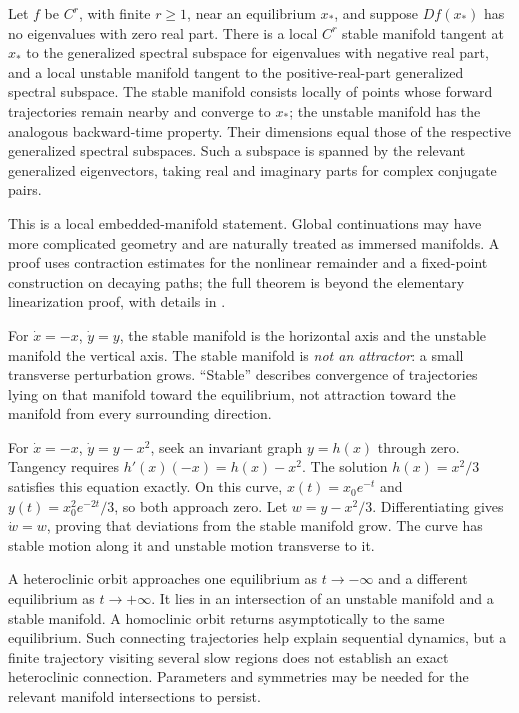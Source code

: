 \begin{theorem}\label{thm:stable-manifold}
Let $f$ be $C^r$, with finite $r\geq1$, near an equilibrium $x_*$, and suppose $Df(x_*)$ has no eigenvalues with zero real part. There is a local $C^r$ stable manifold tangent at $x_*$ to the generalized spectral subspace for eigenvalues with negative real part, and a local unstable manifold tangent to the positive-real-part generalized spectral subspace. The stable manifold consists locally of points whose forward trajectories remain nearby and converge to $x_*$; the unstable manifold has the analogous backward-time property. Their dimensions equal those of the respective generalized spectral subspaces. Such a subspace is spanned by the relevant generalized eigenvectors, taking real and imaginary parts for complex conjugate pairs.
\end{theorem}
This is a local embedded-manifold statement. Global continuations may have more complicated geometry and are naturally treated as immersed manifolds. A proof uses contraction estimates for the nonlinear remainder and a fixed-point construction on decaying paths; the full theorem is beyond the elementary linearization proof, with details in \citet{teschl2012}.

For $\dot x=-x$, $\dot y=y$, the stable manifold is the horizontal axis and the unstable manifold the vertical axis. The stable manifold is \emph{not an attractor}: a small transverse perturbation grows. ``Stable'' describes convergence of trajectories lying on that manifold toward the equilibrium, not attraction toward the manifold from every surrounding direction.

\begin{example}
For $\dot x=-x$, $\dot y=y-x^2$, seek an invariant graph $y=h(x)$ through zero. Tangency requires $h'(x)(-x)=h(x)-x^2$. The solution $h(x)=x^2/3$ satisfies this equation exactly. On this curve, $x(t)=x_0e^{-t}$ and $y(t)=x_0^2e^{-2t}/3$, so both approach zero. Let $w=y-x^2/3$. Differentiating gives $\dot w=w$, proving that deviations from the stable manifold grow. The curve has stable motion along it and unstable motion transverse to it.
\end{example}

A heteroclinic orbit approaches one equilibrium as $t\to-\infty$ and a different equilibrium as $t\to+\infty$. It lies in an intersection of an unstable manifold and a stable manifold. A homoclinic orbit returns asymptotically to the same equilibrium. Such connecting trajectories help explain sequential dynamics, but a finite trajectory visiting several slow regions does not establish an exact heteroclinic connection. Parameters and symmetries may be needed for the relevant manifold intersections to persist.

